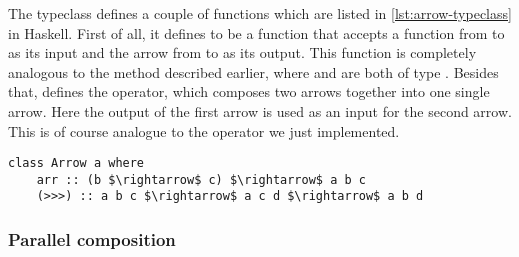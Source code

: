 The  typeclass defines a couple of functions which are listed in \cref{lst:arrow-typeclass} in Haskell. First of all, it defines  to be a function that accepts a function from  to  as its input and the arrow from  to  as its output. This function is completely analogous to the  method described earlier, where  and  are both of type \obs. Besides that,  defines the \code{>>>} operator, which composes two arrows together into one single arrow. Here the output of the first arrow is used as an input for the second arrow. This is of course analogue to the  operator we just implemented.

\begin{lstlisting}[style=HaskellStyle, caption={\code{Arrow} typeclass}, label={lst:arrow-typeclass}]
class Arrow a where
    arr :: (b $\rightarrow$ c) $\rightarrow$ a b c
    (>>>) :: a b c $\rightarrow$ a c d $\rightarrow$ a b d
\end{lstlisting}

\subsubsection{Parallel composition}











































